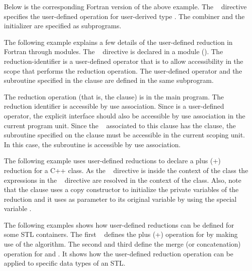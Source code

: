 
Below is the corresponding Fortran version of the above example.  The ~ directive specifies the user-defined operation  for user-derived type .  The combiner  and the initializer  are specified as subprograms.



The following example explains a few details of the user-defined reduction 
in Fortran through modules. The ~ directive is declared in a module (). 
The reduction-identifier  is a user-defined operator that is
to allow accessibility in the scope that performs the reduction
operation.
The user-defined operator  and the subroutine  specified in the  clause are defined in the same subprogram.

The reduction operation (that is, the  clause) is in the main program.
The reduction identifier  is accessible by use association.
Since  is a user-defined operator, the explicit interface
should also be accessible by use association in the current
program unit.
Since the ~ associated to this  clause
has the  clause, the subroutine specified on the clause
must be accessible in the current scoping unit.  In this case,
the subroutine  is accessible by use association.



The following example uses user-defined reductions to declare a plus (+) reduction for a C++ class. As the ~ directive is inside the context of the  class the expressions in the ~ directive are resolved in the context of the class. Also, note that the  clause uses a copy constructor to initialize the private variables of the reduction and it uses as parameter to its original variable by using the special variable .


The following examples shows how user-defined reductions can be defined for some STL containers. The first ~ defines the plus (+) operation for  by making use of the  algorithm. The second and third define the merge (or concatenation) operation for  and . 
It shows how the user-defined reduction operation can be applied to specific data types of an STL.


